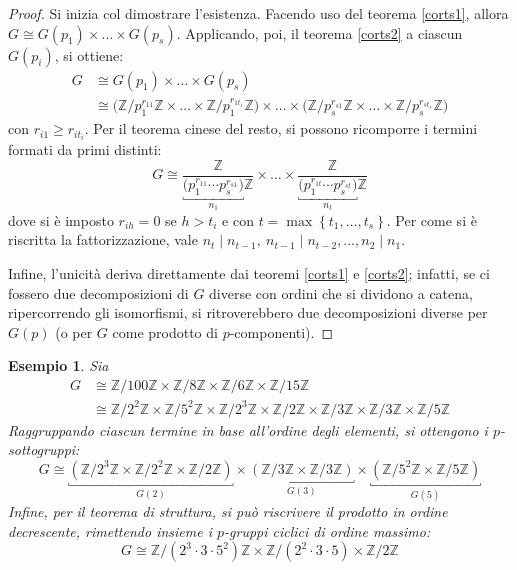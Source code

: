 \documentclass[11pt]{article}
\theoremstyle{style}
\newtheorem{esempio}{Esempio}[section]
\numberwithin{equation}{subsection}
\begin{document}
	\begin{proof}
		Si inizia col dimostrare l'esistenza. 
		Facendo uso del teorema \ref{corts1}, allora $G \cong G(p_1) \times \ldots \times G(p_s)$. 
		Applicando, poi, il teorema \ref{corts2} a ciascun $G(p_i)$, si ottiene:
		\[
			\begin{split}
				G &\cong G(p_1) \times  \ldots \times G(p_s) \\
				  &\cong \Big(\mathbb{Z}/p_1^{r_{11} }\mathbb{Z} \times \ldots \times \mathbb{Z}/ p_1^{r_{1t_1} }\mathbb{Z}\Big) \times  \ldots \times \Big(\mathbb{Z}/ p_s^{r_{s1} }\mathbb{Z}\times  \ldots\times \mathbb{Z}/p_s^{r_{st_s} }\mathbb{Z}  \Big) 
			\end{split}
		\] 
		con $r_{i 1} \ge r_{i t_i} $. 
		Per il teorema cinese del resto, si possono ricomporre i termini formati da primi distinti:
		\[
			G\cong \frac{\mathbb{Z}}{\underbracket{\big(p_1^{r_{11}} \cdots p_s^{r_{s 1} } \big)}_{n_1} \mathbb{Z}} \times  \ldots \times \frac{\mathbb{Z}}{ \underbracket{\big(p_1^{r_{1t} }\cdots p_s^{r_{st} } \big)}_{n_t} \mathbb{Z}}
		\] 
	dove si \`e imposto $r_{ih} =0$ se $h>t_i$ e con $t = \max \left\{ t_1,\ldots,t_s \right\} $.
	Per come si \`e riscritta la fattorizzazione, vale $n_t  \mid  n_{t-1} , \ n_{t-1}  \mid n_{t-2} , \ldots, n_2 \mid n_1$.

	Infine, l'unicit\`a deriva direttamente dai teoremi \ref{corts1} e \ref{corts2}; infatti, se ci fossero due decomposizioni di $G$ diverse con ordini che si dividono a catena, ripercorrendo gli isomorfismi, si ritroverebbero due decomposizioni diverse per $G(p)$ (o per $G$ come prodotto di $p$-componenti).
	\end{proof}
\begin{esempio}
	Sia 
	\[
		\begin{split}
			G &\cong \mathbb{Z}/100\mathbb{Z} \times \mathbb{Z}/8\mathbb{Z} \times \mathbb{Z}/6\mathbb{Z} \times  \mathbb{Z}/15\mathbb{Z}\\
			  &\cong \mathbb{Z}/2^2\mathbb{Z} \times \mathbb{Z}/5^2\mathbb{Z}\times \mathbb{Z}/2^3 \mathbb{Z}\times \mathbb{Z}/2\mathbb{Z} \times \mathbb{Z}/3\mathbb{Z}\times \mathbb{Z}/3\mathbb{Z}\times \mathbb{Z}/5\mathbb{Z}
		\end{split}
	\] 
	Raggruppando ciascun termine in base all'ordine degli elementi, si ottengono i $p$-sottogruppi:
	\[
		G\cong \underbracket{\left(\mathbb{Z}/2^3 \mathbb{Z}\times \mathbb{Z}/2^2\mathbb{Z} \times \mathbb{Z}/2\mathbb{Z}\right)}_{G(2)}  \times \underbracket{\left(\mathbb{Z}/3\mathbb{Z} \times \mathbb{Z}/3\mathbb{Z}\right) }_{G(3)} \times \underbracket{\left(\mathbb{Z}/5^2 \mathbb{Z} \times \mathbb{Z}/5\mathbb{Z}\right) }_{G(5)} 
	\] 
	Infine, per il teorema di struttura, si pu\`o riscrivere il prodotto in ordine decrescente, rimettendo insieme i $p$-gruppi ciclici di ordine massimo:
	\[
	G\cong \mathbb{Z}/\left(2^3 \cdot 3\cdot 5^{2}\right) \mathbb{Z} \times \mathbb{Z}/\left(2^2 \cdot 3\cdot 5\right) \times \mathbb{Z}/2\mathbb{Z}
	\] 
\end{esempio}
\end{document}
